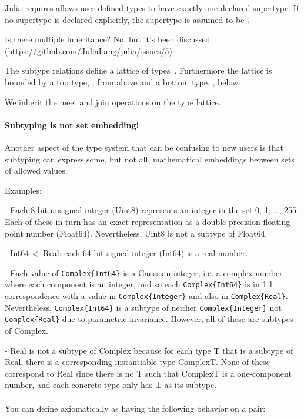 \documentclass[pldi]{sigplanconf-pldi15}
\begin{document}
Julia requires allows user-defined types to have exactly one declared supertype.
If no supertype is declared explicitly, the supertype is assumed to be .

Is there multiple inheritance?
No, but it's been discussed (https://github.com/JuliaLang/julia/issues/5)

The subtype relations define a lattice of types~\cite{Scott1976}. Furthermore
the lattice is bounded by a top type, , from above and a bottom
type, , below.

We inherit the meet and join operations on the type lattice.

\paragraph{Subtyping is not set embedding!}
Another aspect of the type system that can be confusing to new users is that
subtyping can express some, but not all, mathematical embeddings between sets
of allowed values.

Examples:

- Each 8-bit unsigned integer (Uint8) represents an integer in the set {0, 1,
\dots, 255}. Each of these in turn has an exact representation as a
double-precision floating point number (Float64). Nevertheless, Uint8 is not a
subtype of Float64.

- Int64 <: Real: each 64-bit signed integer (Int64) is a real number.

- Each value of \verb|Complex{Int64}| is a Gaussian integer, i.e. a complex number
where each component is an integer, and so each \verb|Complex{Int64}| is in 1:1
correspondence with a value in \verb|Complex{Integer}| and also in \verb|Complex{Real}|.
Nevertheless, \verb|Complex{Int64}| is a subtype of neither \verb|Complex{Integer}| not
\verb|Complex{Real}| due to parametric invariance. However, all of these are subtypes
of Complex.

- Real is not a subtype of Complex because for each type T that is a subtype of
Real, there is a corresponding instantiable type Complex{T}. None of these
correspond to Real since there is no T such that Complex{T} is a one-component
number, and each concrete type only has $\bot$ as its subtype.  


\paragraph{}

You can define  axiomatically as having the following behavior on a  pair:
\end{document}
